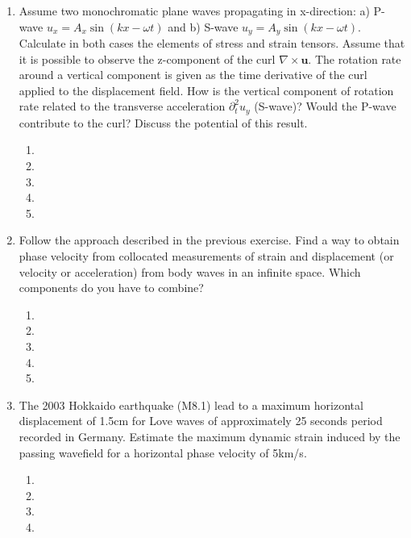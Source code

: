 \begin{enumerate}
\begin{enumerate}
\item[]
\item[]
\item[] 
\item[]
\item[] 
\end{enumerate}
\item
Assume two monochromatic plane waves propagating in x-direction: a) P-wave $u_x=A_x \sin (kx-\omega t)$ and b) S-wave $u_y=A_y \sin(kx-\omega t)$. Calculate in both cases the elements of stress and strain  tensors. Assume that it is possible to observe the z-component of the curl $\nabla \times \textbf{u}$. The rotation  rate around a vertical component is given as the time derivative of the curl applied to the displacement field. How is the vertical component of rotation rate related to the transverse acceleration $\partial^2_t u_y$ (S-wave)? Would the P-wave contribute to the curl? Discuss the potential of this result. 
\begin{enumerate}
\item[]
\item[]
\item[] 
\item[]
\item[] 
\end{enumerate}
\item
Follow the approach described in the previous exercise. Find a way to obtain phase velocity from collocated measurements of strain and displacement (or velocity or acceleration) from body waves in an infinite space. Which components do you have to combine?
\begin{enumerate}
\item[]
\item[]
\item[] 
\item[]
\item[] 
\end{enumerate}
\item
The 2003 Hokkaido earthquake (M8.1) lead to a maximum horizontal displacement of 1.5cm for Love waves of approximately 25 seconds period recorded in Germany. Estimate the maximum dynamic strain induced by the passing wavefield for a horizontal phase velocity of 5km/s. 
\begin{enumerate}
\item[]
\item[]
\item[] 
\item[]

\end{enumerate}
\end{enumerate}
